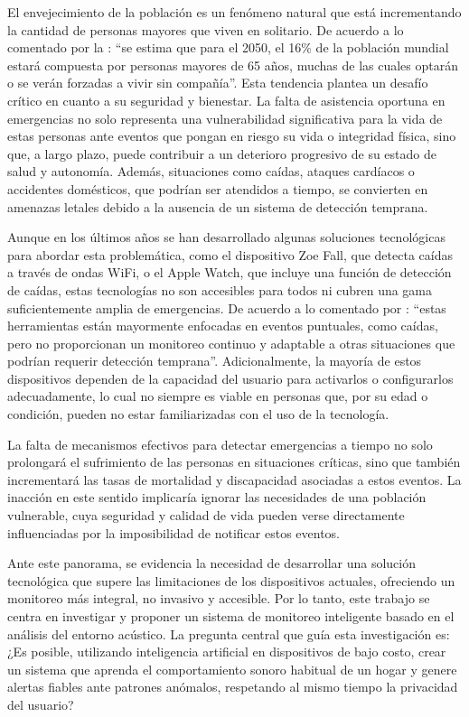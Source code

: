 El envejecimiento de la población es un fenómeno natural que está incrementando la cantidad de personas mayores que viven en solitario. De acuerdo a lo comentado por la \citeauthor{naciones_unidas_envejecimiento_2022} \citeyear{naciones_unidas_envejecimiento_2022}: ``se estima que para el 2050, el 16\% de la población mundial estará compuesta por personas mayores de 65 años, muchas de las cuales optarán o se verán forzadas a vivir sin compañía''. Esta tendencia plantea un desafío crítico en cuanto a su seguridad y bienestar. La falta de asistencia oportuna en emergencias no solo representa una vulnerabilidad significativa para la vida de estas personas ante eventos que pongan en riesgo su vida o integridad física, sino que, a largo plazo, puede contribuir a un deterioro progresivo de su estado de salud y autonomía. Además, situaciones como caídas, ataques cardíacos o accidentes domésticos, que podrían ser atendidos a tiempo, se convierten en amenazas letales debido a la ausencia de un sistema de detección temprana.

Aunque en los últimos años se han desarrollado algunas soluciones tecnológicas para abordar esta problemática, como el dispositivo Zoe Fall, que detecta caídas a través de ondas WiFi, o el Apple Watch, que incluye una función de detección de caídas, estas tecnologías no son accesibles para todos ni cubren una gama suficientemente amplia de emergencias. De acuerdo a lo comentado por \citeauthor{carmona_enchufe_2024} \citeyear{carmona_enchufe_2024}: ``estas herramientas están mayormente enfocadas en eventos puntuales, como caídas, pero no proporcionan un monitoreo continuo y adaptable a otras situaciones que podrían requerir detección temprana''. Adicionalmente, la mayoría de estos dispositivos dependen de la capacidad del usuario para activarlos o configurarlos adecuadamente, lo cual no siempre es viable en personas que, por su edad o condición, pueden no estar familiarizadas con el uso de la tecnología.

La falta de mecanismos efectivos para detectar emergencias a tiempo no solo prolongará el sufrimiento de las personas en situaciones críticas, sino que también incrementará las tasas de mortalidad y discapacidad asociadas a estos eventos. La inacción en este sentido implicaría ignorar las necesidades de una población vulnerable, cuya seguridad y calidad de vida pueden verse directamente influenciadas por la imposibilidad de notificar estos eventos.

Ante este panorama, se evidencia la necesidad de desarrollar una solución tecnológica que supere las limitaciones de los dispositivos actuales, ofreciendo un monitoreo más integral, no invasivo y accesible. Por lo tanto, este trabajo se centra en investigar y proponer un sistema de monitoreo inteligente basado en el análisis del entorno acústico. La pregunta central que guía esta investigación es: ¿Es posible, utilizando inteligencia artificial en dispositivos de bajo costo, crear un sistema que aprenda el comportamiento sonoro habitual de un hogar y genere alertas fiables ante patrones anómalos, respetando al mismo tiempo la privacidad del usuario?

